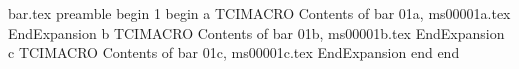 bar.tex preamble
begin
1
begin
a
TCIMACRO
Contents of bar 01a, ms00001a.tex
EndExpansion
b
TCIMACRO
Contents of bar 01b, ms00001b.tex
EndExpansion
c
TCIMACRO
Contents of bar 01c, ms00001c.tex
EndExpansion
end
end

